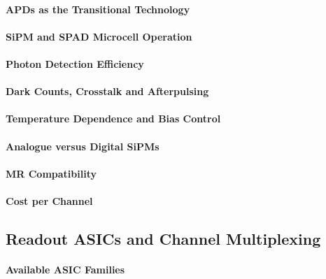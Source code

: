 \paragraph{APDs as the Transitional Technology}

\paragraph{SiPM and SPAD Microcell Operation}

\paragraph{Photon Detection Efficiency}

\paragraph{Dark Counts, Crosstalk and Afterpulsing}

\paragraph{Temperature Dependence and Bias Control}

\paragraph{Analogue versus Digital SiPMs}

\paragraph{MR Compatibility}

\paragraph{Cost per Channel}

\subsection{Readout ASICs and Channel Multiplexing}
\label{sec:readout-asics}

\paragraph{Available ASIC Families}

